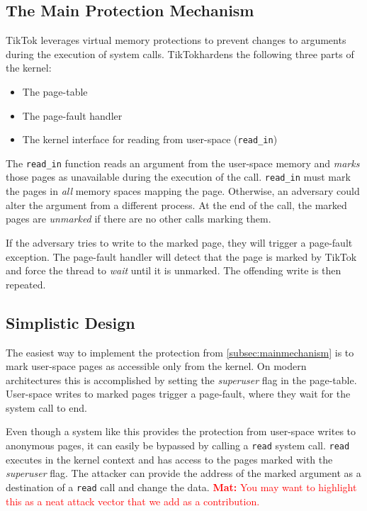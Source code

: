 \documentclass[conference]{IEEEtran}
\newcommand{\mat}[1]{\textcolor{red}{\textbf{Mat:} #1}}
\newcommand{\sysname}{TikTok}
\begin{document}
\subsection{The Main Protection Mechanism}
\label{subsec:mainmechanism}

\sysname{} leverages virtual memory protections to
prevent changes to arguments during the execution of system calls.
\sysname hardens the following three parts of the kernel:

\begin{itemize}
\item The page-table
\item The page-fault handler
\item The kernel interface for reading from user-space (\texttt{read\_in})
\end{itemize}

The \texttt{read\_in} function reads an argument from the user-space memory and
\emph{marks} those pages as unavailable during the execution of the call.
\texttt{read\_in} must mark the pages in \emph{all} memory spaces mapping the
page. Otherwise, an adversary could alter the argument from a different process.
At the end of the call, the marked pages are \emph{unmarked} if there are no
other calls marking them.

If the adversary tries to write to the marked page, they will trigger a
page-fault exception. The page-fault handler will detect that the page is marked
by \sysname{} and force the thread to \emph{wait} until it is unmarked. The
offending write is then repeated. 


\subsection{Simplistic Design}
\label{subsec:simplistic}
The easiest way to implement the protection from \autoref{subsec:mainmechanism}
is to mark user-space pages as accessible only from the kernel. On modern
architectures this is accomplished by setting the \emph{superuser} flag in the
page-table. User-space writes to marked pages trigger a page-fault, where they
wait for the system call to end.

Even though a system like this provides the protection from user-space
writes to anonymous pages, it can easily be bypassed by calling a \texttt{read}
system call. \texttt{read} executes in the kernel context and has access to 
the pages marked with the \emph{superuser} flag. The attacker can provide the
address of the marked argument as a destination of a \texttt{read} call and 
change the data.
\mat{You may want to highlight this as a neat attack vector that we add as a
contribution.}
\end{document}
